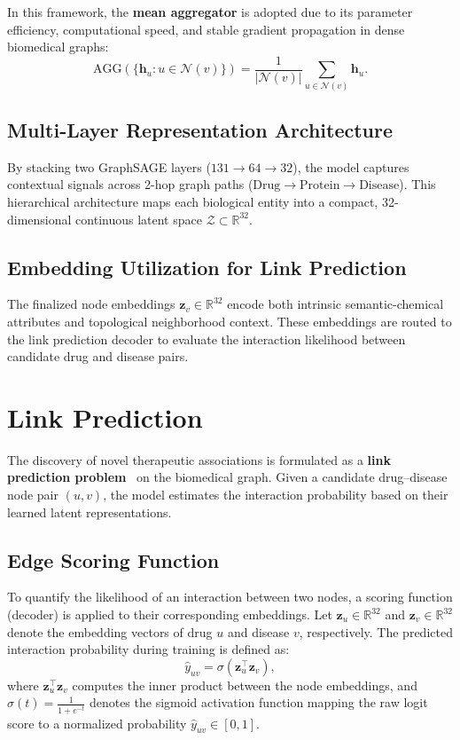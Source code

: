 \documentclass[conference,a4paper]{IEEEtran}
\begin{document}
In this framework, the \textbf{mean aggregator} is adopted due to its parameter efficiency, computational speed, and stable gradient propagation in dense biomedical graphs:
\begin{equation}
    \mathrm{AGG}\left( \{ \mathbf{h}_u : u \in \mathcal{N}(v) \} \right) = \frac{1}{|\mathcal{N}(v)|} \sum_{u \in \mathcal{N}(v)} \mathbf{h}_u.
\end{equation}

\subsection{Multi-Layer Representation Architecture}
By stacking two GraphSAGE layers ($131 \to 64 \to 32$), the model captures contextual signals across 2-hop graph paths ($\text{Drug} \to \text{Protein} \to \text{Disease}$). This hierarchical architecture maps each biological entity into a compact, 32-dimensional continuous latent space $\mathcal{Z} \subset \mathbb{R}^{32}$.

\subsection{Embedding Utilization for Link Prediction}
The finalized node embeddings $\mathbf{z}_v \in \mathbb{R}^{32}$ encode both intrinsic semantic-chemical attributes and topological neighborhood context. These embeddings are routed to the link prediction decoder to evaluate the interaction likelihood between candidate drug and disease pairs.

\section{Link Prediction}
The discovery of novel therapeutic associations is formulated as a \textbf{link prediction problem}~\cite{ref11} on the biomedical graph. Given a candidate drug--disease node pair $(u, v)$, the model estimates the interaction probability based on their learned latent representations.

\subsection{Edge Scoring Function}
To quantify the likelihood of an interaction between two nodes, a scoring function (decoder) is applied to their corresponding embeddings. Let $\mathbf{z}_u \in \mathbb{R}^{32}$ and $\mathbf{z}_v \in \mathbb{R}^{32}$ denote the embedding vectors of drug $u$ and disease $v$, respectively. The predicted interaction probability during training is defined as:
\begin{equation}
    \hat{y}_{uv} = \sigma \left( \mathbf{z}_u^\top \mathbf{z}_v \right),
\end{equation}
where $\mathbf{z}_u^\top \mathbf{z}_v$ computes the inner product between the node embeddings, and $\sigma(t) = \frac{1}{1 + e^{-t}}$ denotes the sigmoid activation function mapping the raw logit score to a normalized probability $\hat{y}_{uv} \in [0, 1]$.
\end{document}
